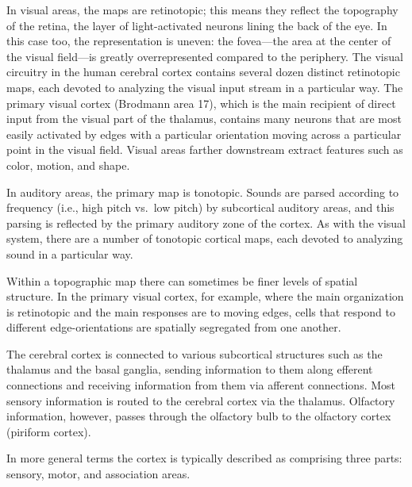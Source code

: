 In visual areas, the maps are retinotopic; this means they reflect the topography of the retina, the layer of light-activated neurons lining the back of the eye. In this case too, the representation is uneven: the fovea---the area at the center of the visual field---is greatly overrepresented compared to the periphery. The visual circuitry in the human cerebral cortex contains several dozen distinct retinotopic maps, each devoted to analyzing the visual input stream in a particular way. The primary visual cortex (Brodmann area 17), which is the main recipient of direct input from the visual part of the thalamus, contains many neurons that are most easily activated by edges with a particular orientation moving across a particular point in the visual field. Visual areas farther downstream extract features such as color, motion, and shape.

In auditory areas, the primary map is tonotopic. Sounds are parsed according to frequency (i.e., high pitch vs.~low pitch) by subcortical auditory areas, and this parsing is reflected by the primary auditory zone of the cortex. As with the visual system, there are a number of tonotopic cortical maps, each devoted to analyzing sound in a particular way.

Within a topographic map there can sometimes be finer levels of spatial structure. In the primary visual cortex, for example, where the main organization is retinotopic and the main responses are to moving edges, cells that respond to different edge-orientations are spatially segregated from one another.

The cerebral cortex is connected to various subcortical structures such as the thalamus and the basal ganglia, sending information to them along efferent connections and receiving information from them via afferent connections. Most sensory information is routed to the cerebral cortex via the thalamus. Olfactory information, however, passes through the olfactory bulb to the olfactory cortex (piriform cortex).

In more general terms the cortex is typically described as comprising three parts: sensory, motor, and association areas.

